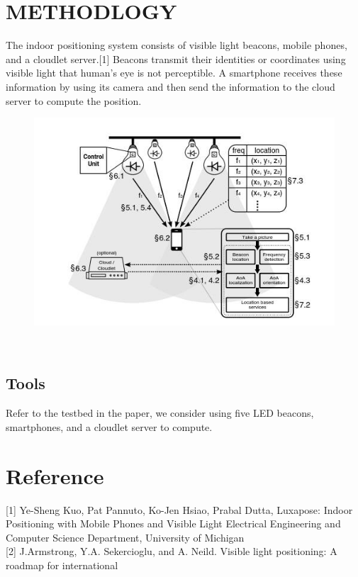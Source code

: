 \documentclass{sig-alternate}
\begin{document}
\section{METHODLOGY}
The indoor positioning system consists of visible light beacons, mobile phones, and a cloudlet server.{[1]} Beacons transmit their identities or coordinates using visible light that human's eye is not perceptible. A smartphone receives these information by using its camera and then send the information to the cloud server to compute the position.
\begin{figure}[ht]
\begin{center}
\includegraphics[scale=0.4]{1}
\caption{}
\end{center}
\end{figure}
\\
\subsection{Tools}
Refer to the testbed in the paper, we consider using five LED beacons, smartphones, and a cloudlet server to compute.  
\section{Reference}
[1] Ye-Sheng Kuo, Pat Pannuto, Ko-Jen Hsiao, Prabal Dutta, Luxapose: Indoor Positioning with Mobile Phones and Visible Light Electrical Engineering and Computer Science Department, University of Michigan\\

[2] J.Armstrong, Y.A. Sekercioglu, and A. Neild. Visible light positioning: A roadmap for international %
\end{document}
